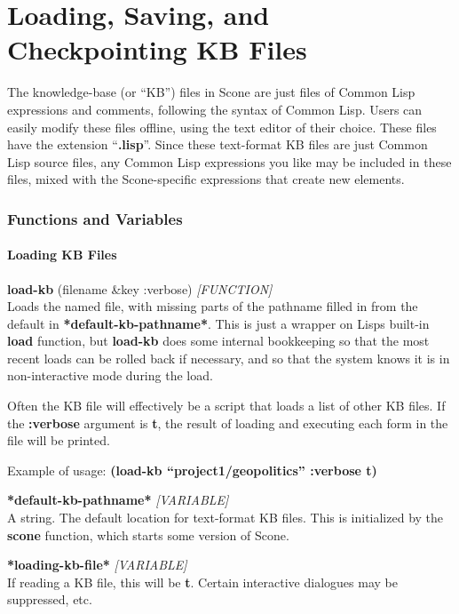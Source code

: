 \documentclass[titlepage,twoside,openright,11pt]{article}
\begin{document}
\section{Loading, Saving, and Checkpointing KB
Files}\label{loading-saving-and-checkpointing-kb-files}

The knowledge-base (or ``KB'') files in Scone are just files of Common
Lisp expressions and comments, following the syntax of Common Lisp.
Users can easily modify these files offline, using the text editor of
their choice. These files have the extension ``\textbf{.lisp}''. Since
these text-format KB files are just Common Lisp source files, any Common
Lisp expressions you like may be included in these files, mixed with the
Scone-specific expressions that create new elements.

\subsubsection{Functions and Variables}\label{functions-and-variables}

\paragraph{Loading KB Files}\label{loading-kb-files}

\textbf{load-kb} (filename \&key :verbose) \emph{{[}FUNCTION{]}}\\
Loads the named file, with missing parts of the pathname filled in from
the default in \textbf{*default-kb-pathname*}. This is just a wrapper on
Lisp\textquotesingle s built-in \textbf{load} function, but
\textbf{load-kb} does some internal bookkeeping so that the most recent
loads can be rolled back if necessary, and so that the system knows it
is in non-interactive mode during the load.

Often the KB file will effectively be a script that loads a list of
other KB files. If the \textbf{:verbose} argument is \textbf{t}, the
result of loading and executing each form in the file will be printed.

Example of usage: \textbf{(load-kb ``project1/geopolitics'' :verbose t)}

\textbf{*default-kb-pathname*} \emph{{[}VARIABLE{]}}\\
A string. The default location for text-format KB files. This is
initialized by the \textbf{scone} function, which starts some version of
Scone.

\textbf{*loading-kb-file*} \emph{{[}VARIABLE{]}}\\
If reading a KB file, this will be \textbf{t}. Certain interactive
dialogues may be suppressed, etc.
\end{document}

